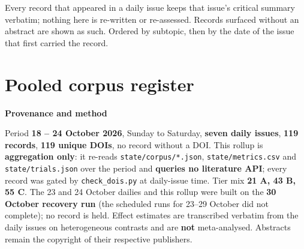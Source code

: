 \documentclass[10pt]{article}
\begin{document}
{\fontsize{7.4}{9}\selectfont\color{Slate}Every record that appeared in a daily issue
keeps that issue's critical summary verbatim; nothing here is re-written or re-assessed.
Records surfaced without an abstract are shown as such. Ordered by subtopic, then by the
date of the issue that first carried the record.\par}



\section*{\sffamily\bfseries\color{Deep}Pooled corpus register}
\vspace{-1.5mm}{\color{Teal}\rule{\linewidth}{1.1pt}}\vspace{2.5mm}



\vspace{4mm}
\begin{keybox}
{\sffamily\bfseries\footnotesize\color{Deep}Provenance and method}\\[1.2mm]
{\fontsize{7.2}{8.8}\selectfont
Period \textbf{18 -- 24 October 2026}, Sunday to Saturday, \textbf{seven daily issues},
\textbf{119 records}, \textbf{119 unique DOIs}, no record without a DOI. This rollup is
\textbf{aggregation only}: it re-reads \texttt{state/corpus/*.json}, \texttt{state/metrics.csv} and
\texttt{state/trials.json} over the period and \textbf{queries no literature API}; every record was gated by
\texttt{check\_dois.py} at daily-issue time. Tier mix \textbf{21 A, 43 B, 55 C}. The 23 and 24 October dailies and
this rollup were built on the \textbf{30 October recovery run} (the scheduled runs for 23--29 October did not
complete); no record is held. Effect estimates are transcribed verbatim from the daily issues on heterogeneous
contrasts and are \textbf{not} meta-analysed. Abstracts remain the copyright of their respective publishers.\par}
\end{keybox}
\end{document}
